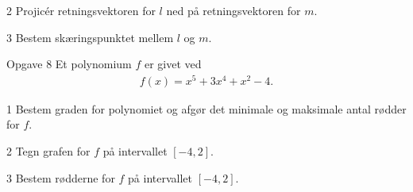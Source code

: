 \documentclass[12pt,x11names,a4paper]{article}
\begin{document}
\begin{delopgave}{}{2}
	Projicér retningsvektoren for $l$ ned på retningsvektoren for $m$.  
\end{delopgave}
\begin{delopgave}{}{3}
	Bestem skæringspunktet mellem $l$ og $m$.
\end{delopgave}
\begin{opgavetekst}{Opgave 8}
	Et polynomium $f$ er givet ved
	\begin{align*}
		f(x) = x^5+3x^4+x^2-4.
	\end{align*}
\end{opgavetekst}
\begin{delopgave}{}{1}
	Bestem graden for polynomiet og afgør det minimale og maksimale antal rødder for $f$. 
\end{delopgave}
\begin{delopgave}{}{2}
	Tegn grafen for $f$ på intervallet $[-4,2]$.
\end{delopgave}
\begin{delopgave}{}{3}
	Bestem rødderne for $f$ på intervallet $[-4,2]$.
\end{delopgave}
\end{document}
